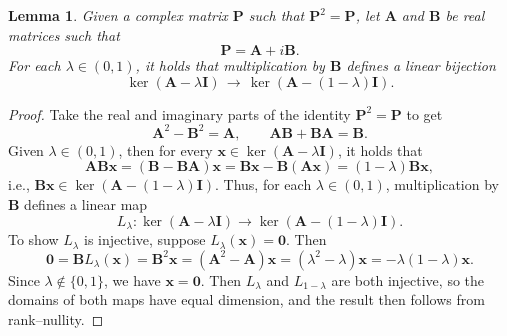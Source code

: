 \documentclass{article}
\theoremstyle{plain}
\newtheorem{lemma}[theorem]{Lemma}
\theoremstyle{definition}
\begin{document}
\begin{lemma}
Given a complex matrix $\boldsymbol{P}$ such that $\boldsymbol{P}^2=\boldsymbol{P}$, let $\boldsymbol{A}$ and $\boldsymbol{B}$ be real matrices such that
\[
\boldsymbol{P}
=\boldsymbol{A}+i\boldsymbol{B}.
\]
For each $\lambda\in(0,1)$, it holds that multiplication by $\boldsymbol{B}$ defines a linear bijection
\[
\operatorname{ker}(\boldsymbol{A}-\lambda\boldsymbol{I})
\,\longrightarrow\,
\operatorname{ker}(\boldsymbol{A}-(1-\lambda)\boldsymbol{I}).
\]
\end{lemma}

\begin{proof}
Take the real and imaginary parts of the identity $\boldsymbol{P}^2=\boldsymbol{P}$ to get
\[
\boldsymbol{A}^2-\boldsymbol{B}^2
=\boldsymbol{A},
\qquad
\boldsymbol{A}\boldsymbol{B}+\boldsymbol{B}\boldsymbol{A}
=\boldsymbol{B}.
\]
Given $\lambda\in(0,1)$, then for every $\boldsymbol{x}\in\operatorname{ker}(\boldsymbol{A}-\lambda\boldsymbol{I})$, it holds that
\[
\boldsymbol{A}\boldsymbol{B}\boldsymbol{x}
=(\boldsymbol{B}-\boldsymbol{B}\boldsymbol{A})\boldsymbol{x}
=\boldsymbol{B}\boldsymbol{x}-\boldsymbol{B}(\boldsymbol{A}\boldsymbol{x})
=(1-\lambda)\boldsymbol{B}\boldsymbol{x},
\]
i.e., $\boldsymbol{B}\boldsymbol{x}\in\operatorname{ker}(\boldsymbol{A}-(1-\lambda)\boldsymbol{I})$.
Thus, for each $\lambda\in(0,1)$, multiplication by $\boldsymbol{B}$ defines a linear map
\[
L_\lambda\colon \operatorname{ker}(\boldsymbol{A}-\lambda\boldsymbol{I})\to\operatorname{ker}(\boldsymbol{A}-(1-\lambda)\boldsymbol{I}).
\]
To show $L_\lambda$ is injective, suppose $L_\lambda(\boldsymbol{x})=\boldsymbol{0}$.
Then
\[
\boldsymbol{0}
=\boldsymbol{B}L_\lambda(\boldsymbol{x})
=\boldsymbol{B}^2\boldsymbol{x}
=(\boldsymbol{A}^2-\boldsymbol{A})\boldsymbol{x}
=(\lambda^2-\lambda)\boldsymbol{x}
=-\lambda(1-\lambda)\boldsymbol{x}.
\]
Since $\lambda\notin\{0,1\}$, we have $\boldsymbol{x}=\boldsymbol{0}$.
Then $L_\lambda$ and $L_{1-\lambda}$ are both injective, so the domains of both maps have equal dimension, and the result then follows from rank--nullity.
\end{proof}
\end{document}
